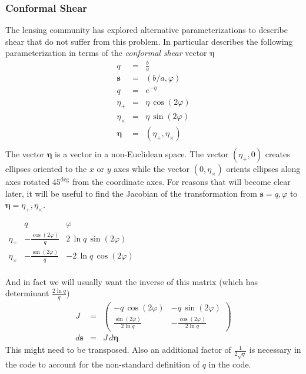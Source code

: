 \documentclass[modern]{aastex62}
\begin{document}
\subsubsection{Conformal Shear}
The lensing community has explored alternative parameterizations to describe shear that do not suffer from this problem.
In particular \citet{bernstein02} describes the following parameterization in terms of the \emph{conformal shear}  vector $\pmb{\eta}$
\begin{eqnarray}
  q & = & \frac{b}{a} \\
  \pmb{s} & = & (b/a, \varphi) \\
  q & = & e^{-\eta} \\
  \eta_+ & = & \eta \, \cos (2\varphi) \\
  \eta_\times & = & \eta \, \sin (2\varphi) \\
  \pmb{\eta} & = &  ( \eta_+, \eta_\times) \\
\end{eqnarray}
The vector $\pmb{\eta}$ is a vector in a non-Euclidean space.  The vector $( \eta_+, 0)$ creates ellipses oriented to the $x$ or $y$ axes while the vector $ (0, \eta_\times)$ orients ellipses along axes rotated $45^{\deg}$ from the coordinate axes.
For reasons that will become clear later, it will be useful to find the Jacobian of the transformation from $\pmb{s} = q, \varphi$ to $\pmb{\eta} = \eta_+, \eta_\times$.
\begin{center}
$
\begin{array}{c|cc}
 & q & \varphi \\
\hline
\eta_+           &  -\frac{\cos(2 \varphi)}{q} & 2 \, \ln q \, \sin(2 \varphi) \\
\eta_\times   & -\frac{\sin(2 \varphi)}{q}  & -2 \, \ln q \, \cos(2 \varphi) \\
\end{array}
$
\end{center}
And in fact we will usually want the inverse of this matrix (which has determinant $\frac{2\ln q}{q}$)
\begin{eqnarray}
  J  & =  & \begin{pmatrix} - q \, \cos(2\varphi) & - q \, \sin(2 \varphi) \\
    \frac{\sin(2 \varphi)}{2\ln q} & -\frac{\cos(2 \varphi)}{2\ln q}
    \end{pmatrix} \\
d\pmb{s} & = & J \, d\pmb{\eta}    
\end{eqnarray}
This might need to be transposed.  Also an additional factor of $\frac{1}{2 \sqrt{q}}$ is necessary in the code to account for the non-standard definition of $q$ in the code.
\end{document}
